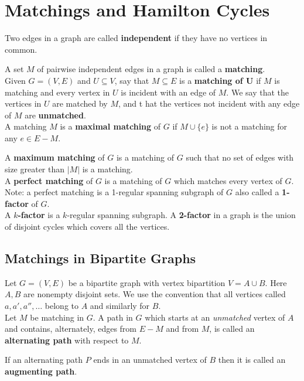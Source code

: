 \chapter{Matchings and Hamilton Cycles}

Two edges in a graph are called \textbf{independent} if they have no vertices in common.

A set \(M\) of pairwise independent edges in a graph is called a \textbf{matching}. \\

Given \(G = (V, E)\) and \(U \subseteq V\), say that \(M \subseteq E\) is a \textbf{matching of U} if \(M\) is matching and every vertex in \(U\) is incident with an edge of \(M\). We say that the vertices in \(U\) are matched by \(M\), and t hat the vertices not incident with any edge of \(M\) are \textbf{unmatched}. \\

A matching \(M\) is a \textbf{maximal matching} of \(G\) if \(M \cup \{e\}\) is not a matching for any \(e \in E - M\).

A \textbf{maximum matching} of \(G\) is a matching of \(G\) such that no set of edges with size greater than \(|M|\) is a matching. \\

A \textbf{perfect matching} of \(G\) is a matching of \(G\) which matches every vertex of \(G\). Note: a perfect matching is a 1-regular spanning subgraph of \(G\) also called a \textbf{1-factor} of \(G\). \\

A \textbf{\(k\)-factor} is a \(k\)-regular spanning subgraph. A \textbf{2-factor} in a graph is the union of disjoint cycles which covers all the vertices.

\section{Matchings in Bipartite Graphs}
Let \(G = (V, E)\) be a bipartite graph with vertex bipartition \(V = A \cup B\). Here \(A, B\) are nonempty disjoint sets. We use the convention that all vertices called \(a, a', a'', \dots\) belong to \(A\) and similarly for \(B\). \\

Let \(M\) be matching in \(G\). A path in \(G\) which starts at an \textit{unmatched} vertex of \(A\) and contains, alternately, edges from \(E - M\) and from \(M\), is called an \textbf{alternating path} with respect to \(M\).

If an alternating path \(P\) ends in an unmatched vertex of \(B\) then it is called an \textbf{augmenting path}.

